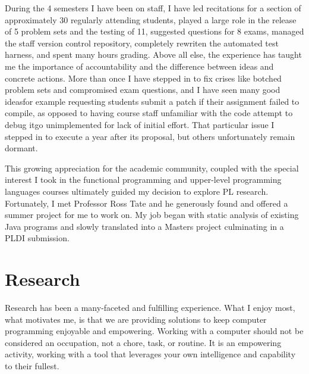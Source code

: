\documentclass{article}
\begin{document}
During the 4 semesters I have been on staff, I have led recitations for a section of approximately 30 regularly attending students, played a large role in the release of 5 problem sets and the testing of 11, suggested questions for 8 exams, managed the staff version control repository, completely rewriten the automated test harness, and spent many hours grading.
Above all else, the experience has taught me the importance of accountability and the difference between ideas and concrete actions.
More than once I have stepped in to fix crises like botched problem sets and compromised exam questions, and I have seen many good ideas\textemdash for example requesting students submit a patch if their assignment failed to compile, as opposed to having course staff unfamiliar with the code attempt to debug it\textemdash go unimplemented for lack of initial effort.
That particular issue I stepped in to execute a year after its proposal, but others unfortunately remain dormant.

This growing appreciation for the academic community, coupled with the special interest I took in the functional programming and upper-level programming languages courses ultimately guided my decision to explore PL research.
Fortunately, I met Professor Ross Tate and he generously found and offered a summer project for me to work on.
My job began with static analysis of existing Java programs and slowly translated into a Masters project culminating in a PLDI submission.

\section{Research}
Research has been a many-faceted and fulfilling experience.
What I enjoy most, what motivates me, is that we are providing solutions to keep computer programming enjoyable and empowering.
Working with a computer should not be considered an occupation, not a chore, task, or routine.
It is an empowering activity, working with a tool that leverages your own intelligence and capability to their fullest.
\end{document}
